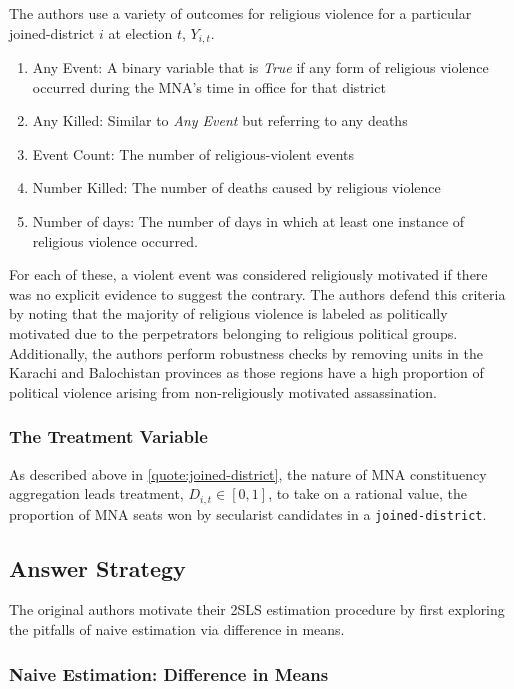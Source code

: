 \documentclass{scrartcl}
\begin{document}
The authors use a variety of outcomes for religious violence for a particular joined-district $i$ at election $t$, $Y_{i,t}$.

\begin{enumerate}
\item Any Event: A binary variable that is \textit{True} if any form of religious violence occurred during the MNA's time in office for that district
\item Any Killed: Similar to \textit{Any Event} but referring to any deaths
\item Event Count: The number of religious-violent events
\item Number Killed: The number of deaths caused by religious violence
\item Number of days: The number of days in which at least one instance of religious violence occurred.
\end{enumerate}

For each of these, a violent event was considered religiously motivated if there was no explicit evidence to suggest the contrary.
The authors defend this criteria by noting that the majority of religious violence is labeled as politically motivated due to the perpetrators belonging to religious political groups.
Additionally, the authors perform robustness checks by removing units in the Karachi and Balochistan provinces as those regions have a high proportion of political violence arising from non-religiously motivated assassination. 

\subsubsection{The Treatment Variable} \label{treatment}

As described above in \ref{quote:joined-district}, the nature of MNA constituency aggregation leads treatment, $D_{i,t} \in [0, 1]$, to take on a rational value, the proportion of MNA seats won by secularist candidates in a \texttt{joined-district}.

\subsection{Answer Strategy} \label{id}

The original authors motivate their 2SLS estimation procedure by first exploring the pitfalls of naive estimation via difference in means.

\subsubsection{Naive Estimation: Difference in Means} \label{dim}
\end{document}
